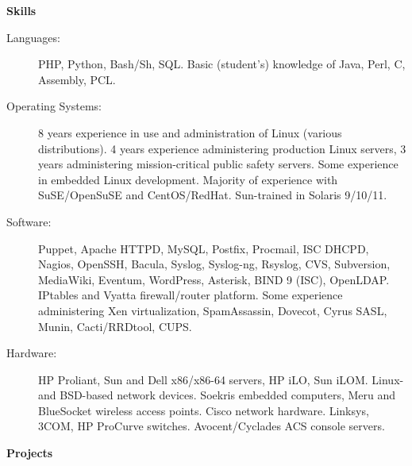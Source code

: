 \documentclass[letterpaper,11pt]{article}
\newcommand{\resheading}[1]{{\large \colorbox{mygrey}{\begin{minipage}{\textwidth}{\textbf{#1 \vphantom{p\^{E}}}}\end{minipage}}}}
\begin{document}
\resheading{Skills}

\begin{description}
\item[Languages:]
PHP, Python, Bash/Sh, SQL. Basic (student's) knowledge of Java, Perl, C,
Assembly, PCL.
\item[Operating Systems:]
8 years experience in use and administration of Linux (various
distributions). 4 years experience administering production Linux servers, 3
years administering mission-critical public safety servers. Some experience in
embedded Linux development. Majority of experience with SuSE/OpenSuSE and
CentOS/RedHat.
Sun-trained in Solaris 9/10/11.
\item[Software:]
Puppet, Apache HTTPD, MySQL, Postfix, Procmail, ISC DHCPD, Nagios, OpenSSH,
Bacula,
Syslog, Syslog-ng, Rsyslog, CVS, Subversion, MediaWiki, Eventum, WordPress,
Asterisk, BIND 9 (ISC), OpenLDAP. IPtables and Vyatta firewall/router
platform. Some experience administering Xen virtualization, SpamAssassin,
Dovecot, Cyrus SASL, Munin, Cacti/RRDtool,  CUPS.

\item[Hardware:]
HP Proliant, Sun and Dell x86/x86-64 servers, HP iLO, Sun iLOM. Linux- and
BSD-based network devices. Soekris embedded computers, Meru and BlueSocket
wireless access points. Cisco network hardware. Linksys, 3COM, HP ProCurve
switches. Avocent/Cyclades ACS console servers.
\end{description}

\pagebreak

\resheading{Projects}
\end{document}
